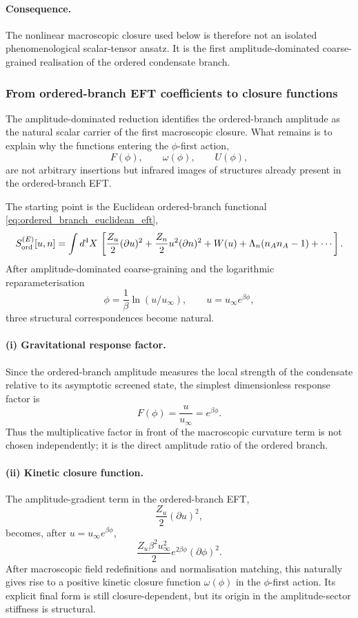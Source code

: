 \documentclass[11pt,a4paper]{article}
\numberwithin{equation}{section}
\begin{document}
\paragraph{Consequence.}
The nonlinear macroscopic closure used below is therefore not an
isolated phenomenological scalar-tensor ansatz.
It is the first amplitude-dominated coarse-grained realisation of the
ordered condensate branch.

\subsubsection*{From ordered-branch EFT coefficients to closure functions}
\label{sec:closure_function_mapping}

The amplitude-dominated reduction identifies the ordered-branch
amplitude as the natural scalar carrier of the first macroscopic
closure.
What remains is to explain why the functions entering the $\phi$-first
action,
\[
F(\phi),\qquad \omega(\phi),\qquad U(\phi),
\]
are not arbitrary insertions but infrared images of structures already
present in the ordered-branch EFT.

The starting point is the Euclidean ordered-branch functional
\eqref{eq:ordered_branch_euclidean_eft},
\[
S_{\rm ord}^{(E)}[u,n]
=
\int d^4X\,
\left[
\frac{Z_u}{2}(\partial u)^2
+\frac{Z_n}{2}u^2(\partial n)^2
+W(u)
+\Lambda_n(n_A n_A-1)
+\cdots
\right].
\]
After amplitude-dominated coarse-graining and the logarithmic
reparameterisation
\[
\phi=\frac{1}{\beta}\ln(u/u_\infty),
\qquad
u=u_\infty e^{\beta\phi},
\]
three structural correspondences become natural.

\paragraph{(i) Gravitational response factor.}
Since the ordered-branch amplitude measures the local strength of the
condensate relative to its asymptotic screened state, the simplest
dimensionless response factor is
\[
F(\phi)=\frac{u}{u_\infty}=e^{\beta\phi}.
\]
Thus the multiplicative factor in front of the macroscopic curvature
term is not chosen independently; it is the direct amplitude ratio of
the ordered branch.

\paragraph{(ii) Kinetic closure function.}
The amplitude-gradient term in the ordered-branch EFT,
\[
\frac{Z_u}{2}(\partial u)^2,
\]
becomes, after $u=u_\infty e^{\beta\phi}$,
\[
\frac{Z_u\beta^2 u_\infty^2}{2}e^{2\beta\phi}(\partial\phi)^2.
\]
After macroscopic field redefinitions and normalisation matching, this
naturally gives rise to a positive kinetic closure function
$\omega(\phi)$ in the $\phi$-first action.
Its explicit final form is still closure-dependent, but its origin in
the amplitude-sector stiffness is structural.
\end{document}

